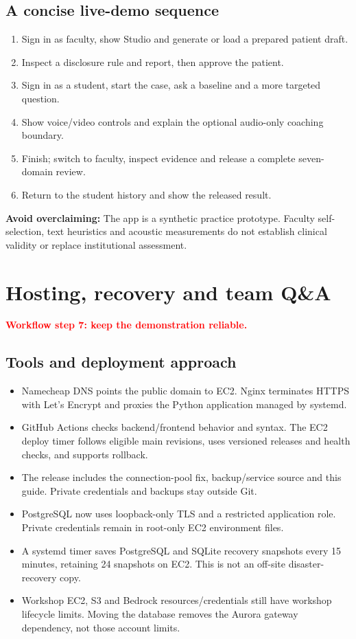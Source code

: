 \documentclass[10pt,letterpaper]{article}
\newcommand{\callout}[1]{\par\vspace{5pt}\noindent\colorbox{pale}{\parbox{\dimexpr\linewidth-2\fboxsep\relax}{\small #1}}\par\vspace{5pt}}
\newcommand{\page}[2]{\clearpage\section{#1}\textcolor{red}{\textbf{#2}}\par}
\begin{document}
\subsection*{A concise live-demo sequence}
\begin{enumerate}[leftmargin=20pt,itemsep=5pt]
\item Sign in as faculty, show Studio and generate or load a prepared patient draft.
\item Inspect a disclosure rule and report, then approve the patient.
\item Sign in as a student, start the case, ask a baseline and a more targeted question.
\item Show voice/video controls and explain the optional audio-only coaching boundary.
\item Finish; switch to faculty, inspect evidence and release a complete seven-domain review.
\item Return to the student history and show the released result.
\end{enumerate}
\callout{\textbf{Avoid overclaiming:} The app is a synthetic practice prototype. Faculty self-selection, text heuristics and acoustic measurements do not establish clinical validity or replace institutional assessment.}

\page{Hosting, recovery and team Q\&A}{Workflow step 7: keep the demonstration reliable.}
\setlength{\parskip}{2pt}
\subsection*{Tools and deployment approach}
\begin{itemize}
\item Namecheap DNS points the public domain to EC2. Nginx terminates HTTPS with Let's Encrypt and proxies the Python application managed by systemd.
\item GitHub Actions checks backend/frontend behavior and syntax. The EC2 deploy timer follows eligible main revisions, uses versioned releases and health checks, and supports rollback.
\item The release includes the connection-pool fix, backup/service source and this guide. Private credentials and backups stay outside Git.
\item PostgreSQL now uses loopback-only TLS and a restricted application role. Private credentials remain in root-only EC2 environment files.
\item A systemd timer saves PostgreSQL and SQLite recovery snapshots every 15 minutes, retaining 24 snapshots on EC2. This is not an off-site disaster-recovery copy.
\item Workshop EC2, S3 and Bedrock resources/credentials still have workshop lifecycle limits. Moving the database removes the Aurora gateway dependency, not those account limits.
\end{itemize}
\end{document}
